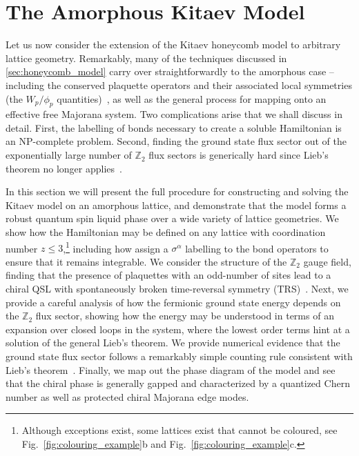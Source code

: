 \section{The Amorphous Kitaev Model} 
\label{sec:amorphous_kitaev_model}
 
Let us now consider the extension of the Kitaev honeycomb model to arbitrary lattice geometry. Remarkably, many of the techniques discussed in \textsection\ref{sec:honeycomb_model} carry over straightforwardly to the amorphous case -- including the conserved plaquette operators and their associated local symmetries (the $W_p/\phi_p$ quantities)~\cite{baskaran_exact_2007,baskaran_spin-s_2008}, as well as the general process for mapping onto an effective free Majorana system. Two complications arise that we shall discuss in detail. First, the labelling of bonds necessary to create a soluble Hamiltonian is an NP-complete problem. Second, finding the ground state flux sector out of the exponentially large number of $\mathbb Z_2$ flux sectors is generically hard since Lieb's theorem no longer applies~\cite{lieb_flux_1994}.

In this section we will present the full procedure for constructing and solving the Kitaev model on an amorphous lattice, and demonstrate that the model forms a robust quantum spin liquid phase over a wide variety of lattice geometries. We show how the Hamiltonian may be defined on any lattice with coordination number $z\leq3$,\footnote{Although exceptions exist, some lattices exist that cannot be coloured, see Fig.~\ref{fig:colouring_example}b and Fig.~\ref{fig:colouring_example}c.} including how assign a $\sigma^\alpha$ labelling to the bond operators to ensure that it remains integrable. We consider the structure of the $\mathbb Z_2$ gauge field, finding that the presence of plaquettes with an odd-number of sites lead to a chiral QSL with spontaneously broken time-reversal symmetry (TRS)~\cite{yao_exact_2007,chua_exact_2011,chua_exactly_2011,fiete_topological_2012,natori_chiral_2016,wu_-matrix_2009, wang_majorana_2021}. Next, we provide a careful analysis of how the fermionic ground state energy depends on the $\mathbb Z_2$ flux sector, showing how the energy may be understood in terms of an expansion over closed loops in the system, where the lowest order terms hint at a solution of the general Lieb's theorem. We provide numerical evidence that the ground state flux sector follows a remarkably simple counting rule consistent with Lieb's theorem~\cite{lieb_flux_1994}. Finally, we map out the phase diagram of the model and see that the chiral phase is generally gapped and characterized by a quantized Chern number as well as protected chiral Majorana edge modes.

